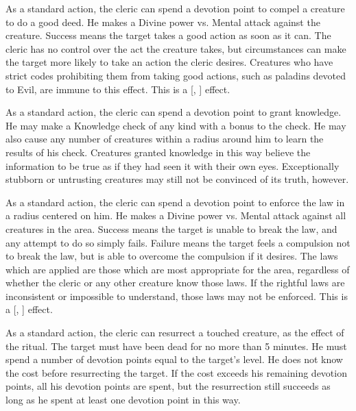             As a standard action, the cleric can spend a devotion point to compel a creature to do a good deed.
            He makes a Divine power vs. Mental attack against the creature.
            Success means the target takes a good action as soon as it can.
            The cleric has no control over the act the creature takes, but circumstances can make the target more likely to take an action the cleric desires.
            Creatures who have strict codes prohibiting them from taking good actions, such as paladins devoted to Evil, are immune to this effect.
            This is a [, ] effect.

            As a standard action, the cleric can spend a devotion point to grant knowledge.
            He may make a Knowledge check of any kind with a  bonus to the check.
            He may also cause any number of creatures within a \arealarge radius around him to learn the results of his check.
            Creatures granted knowledge in this way believe the information to be true as if they had seen it with their own eyes.
            Exceptionally stubborn or untrusting creatures may still not be convinced of its truth, however.

            As a standard action, the cleric can spend a devotion point to enforce the law in a \arealarge radius  centered on him.
            He makes a Divine power vs. Mental attack against all creatures in the area.
            Success means the target is unable to break the law, and any attempt to do so simply fails.
            Failure means the target feels a compulsion not to break the law, but is able to overcome the compulsion if it desires.
            The laws which are applied are those which are most appropriate for the area, regardless of whether the cleric or any other creature know those laws.
            If the rightful laws are inconsistent or impossible to understand, those laws may not be enforced.
            This is a [, ] effect.

            As a standard action, the cleric can resurrect a touched creature, as the effect of the  ritual.
            The target must have been dead for no more than 5 minutes.
            He must spend a number of devotion points equal to the target's level.
            He does not know the cost before resurrecting the target.
            If the cost exceeds his remaining devotion points, all his devotion points are spent, but the resurrection still succeeds as long as he spent at least one devotion point in this way.

